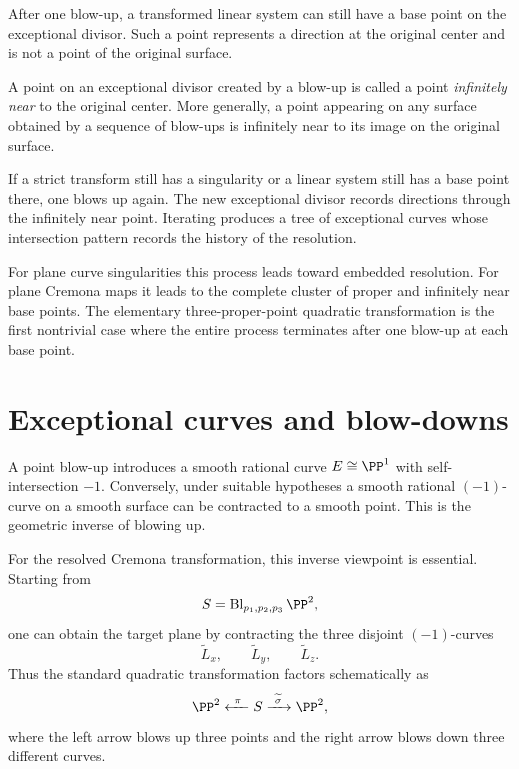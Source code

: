After one blow-up, a transformed linear system can still have a base point on the exceptional divisor.  Such a point represents a direction at the original center and is not a point of the original surface.

\begin{definition}\label{def:vi45-infinitely-near}
A point on an exceptional divisor created by a blow-up is called a point \emph{infinitely near} to the original center.  More generally, a point appearing on any surface obtained by a sequence of blow-ups is infinitely near to its image on the original surface.
\end{definition}

If a strict transform still has a singularity or a linear system still has a base point there, one blows up again.  The new exceptional divisor records directions through the infinitely near point.  Iterating produces a tree of exceptional curves whose intersection pattern records the history of the resolution.

For plane curve singularities this process leads toward embedded resolution.  For plane Cremona maps it leads to the complete cluster of proper and infinitely near base points.  The elementary three-proper-point quadratic transformation is the first nontrivial case where the entire process terminates after one blow-up at each base point.



\section{Exceptional curves and blow-downs}

A point blow-up introduces a smooth rational curve \(E\cong\PP^1\) with self-intersection \(-1\).  Conversely, under suitable hypotheses a smooth rational \((-1)\)-curve on a smooth surface can be contracted to a smooth point.  This is the geometric inverse of blowing up.

For the resolved Cremona transformation, this inverse viewpoint is essential.  Starting from
\[
  S=\Bl_{p_1,p_2,p_3}\PP^2,
\]
one can obtain the target plane by contracting the three disjoint \((-1)\)-curves
\[
  \widetilde L_x,
  \qquad
  \widetilde L_y,
  \qquad
  \widetilde L_z.
\]
Thus the standard quadratic transformation factors schematically as
\[
  \PP^2
  \xleftarrow{\ \pi\ }
  S
  \xrightarrow{\ \widetilde\sigma\ }
  \PP^2,
\]
where the left arrow blows up three points and the right arrow blows down three different curves.

